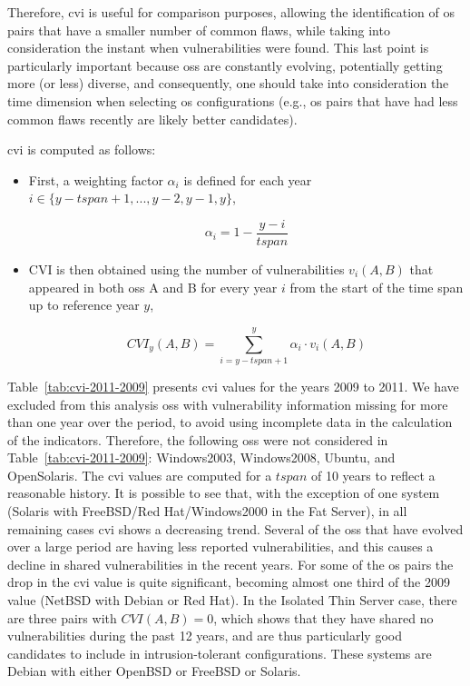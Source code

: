 Therefore, \gls{cvi} is useful for comparison purposes, allowing the identification of \gls{os} pairs that have a smaller number of common flaws, while taking into consideration the instant when vulnerabilities were found. 
This last point is particularly important because \glspl{os} are constantly evolving, potentially getting more (or less) diverse, and consequently, one should take into consideration the time dimension when selecting \gls{os} configurations (e.g., \gls{os} pairs that have had less common flaws recently are likely better candidates).

\gls{cvi} is computed as follows:

\begin{itemize}

\item First, a weighting factor $\alpha_{i}$ is defined for each year   $i \in \{y-\mathit{tspan}+1, ..., y-2, y-1, y\}$,

\begin{equation}
\alpha_{i} = 1 - \frac{y-i}{\mathit{tspan}}
\end{equation}

\item CVI is then obtained using the number of vulnerabilities $v_{i}(A,B)$ that appeared in both \glspl{os} A and B for every year $i$ from the start of the time span up to reference year $y$,

\begin{equation}
\mathit{CVI}_{y}(A,B)= \sum_{i = y-\mathit{tspan}+1}^{y} \alpha_{i}\cdot v_{i}(A,B)
\end{equation}

\end{itemize}


Table~\ref{tab:cvi-2011-2009} presents \gls{cvi} values for the years 2009 to 2011. 
We have excluded from this analysis \glspl{os} with vulnerability information missing for more than one year over the period, to avoid using incomplete data in the calculation of the indicators. Therefore, the following \glspl{os} were not considered in Table~\ref{tab:cvi-2011-2009}: Windows2003, Windows2008, Ubuntu, and OpenSolaris. 
The \gls{cvi} values are computed for a $\mathit{tspan}$ of 10 years to reflect a reasonable history. 
It is possible to see that, with the exception of one system (Solaris with FreeBSD/Red Hat/Windows2000 in the Fat Server), in all remaining cases \gls{cvi} shows a decreasing trend. 
Several of the \glspl{os} that have evolved over a large period are having less reported vulnerabilities, and this causes a decline in shared vulnerabilities in the recent years. 
For some of the \gls{os} pairs the drop in the \gls{cvi} value is quite significant, becoming almost one third of the 2009 value (NetBSD with Debian or Red Hat). 
In the Isolated Thin Server case, there are three pairs with $\mathit{CVI}(A,B)=0$, which shows that they have shared no vulnerabilities during the past 12 years, and are thus particularly good candidates to include in intrusion-tolerant configurations. 
These systems are Debian with either OpenBSD or FreeBSD or Solaris.

